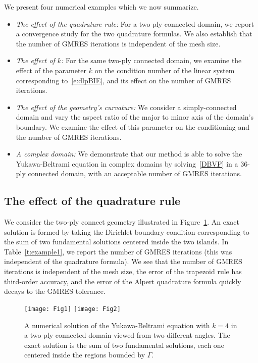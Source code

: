 We present four numerical examples which we now summarize.
\begin{itemize}
  \item{\em{The effect of the quadrature rule}:} For a two-ply connected
  domain, we report a convergence study for the two quadrature formulas.
  We also establish that the number of GMRES iterations is independent
  of the mesh size.

  \item{\em{The effect of $k$}:} For the same two-ply connected
  domain, we examine the effect of the parameter $k$ on the condition
  number of the linear system corresponding to~\eqref{e:dlpBIE}, and
  its effect on the number of GMRES iterations.

  \item{\em{The effect of the geometry's curvature}:} We consider a
  simply-connected domain and vary the aspect ratio of the major to
  minor axis of the domain's boundary.  We examine the effect of this
  parameter on the conditioning and the number of GMRES iterations.

  \item{\em{A complex domain}:} We demonstrate that our method is able
  to solve the Yukawa-Beltrami equation in complex domains by
  solving~\eqref{DBVP} in a 36-ply connected domain, with an acceptable
  number of GMRES iterations.
\end{itemize}


\subsection{The effect of the quadrature rule}
We consider the two-ply connect geometry illustrated in
Figure~\ref{f:twoply}.  An exact solution is formed by taking the
Dirichlet boundary condition corresponding to the sum of two fundamental
solutions centered inside the two islands.  In Table~\ref{t:example1},
we report the number of GMRES iterations (this was independent of the
quadrature formula).  We see that the number of GMRES iterations is
independent of the mesh size, the error of the trapezoid rule has
third-order accuracy, and the error of the Alpert quadrature formula
quickly decays to the GMRES tolerance.

\begin{figure}[htps]
  \texttt{[image: Fig1]}
  \texttt{[image: Fig2]}
\caption{\label{f:twoply} A numerical solution of the Yukawa-Beltrami
equation with $k=4$ in a two-ply connected domain viewed from two
different angles.  The exact solution is the sum of two fundamental
solutions, each one centered inside the regions bounded by $\Gamma$.}
\end{figure}


